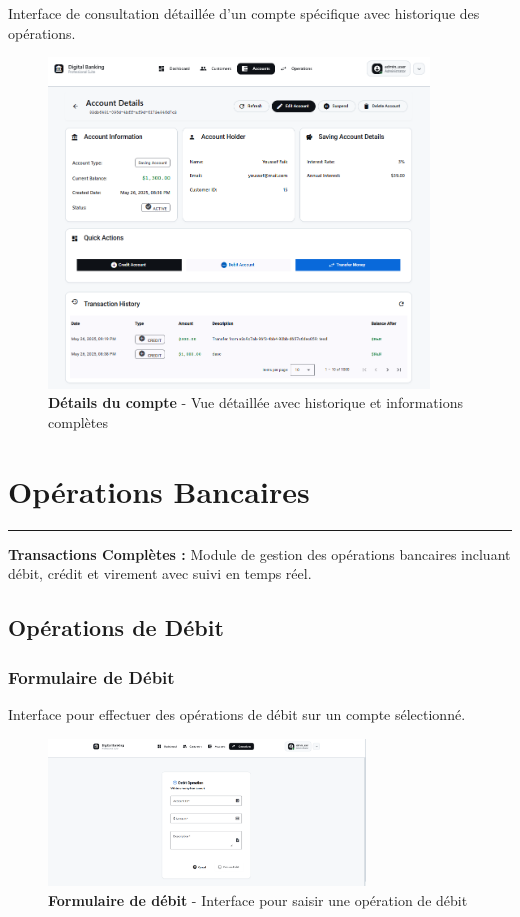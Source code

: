 \documentclass[11pt, a4paper]{article}
\newcommand{\accentline}{\textcolor{accent}{\rule{\textwidth}{1pt}}}
\begin{document}
Interface de consultation détaillée d'un compte spécifique avec historique des opérations.

\begin{figure}[H]
    \centering
    \includegraphics[width=0.9\textwidth]{screenshots/05_05_account_details_view.png}
    \caption{\textbf{Détails du compte} - Vue détaillée avec historique et informations complètes}
    \label{fig:account_details_view}
\end{figure}

\section{Opérations Bancaires}
\accentline

\textbf{Transactions Complètes :} Module de gestion des opérations bancaires incluant débit, crédit et virement avec suivi en temps réel.

\subsection{Opérations de Débit}

\subsubsection{Formulaire de Débit}

Interface pour effectuer des opérations de débit sur un compte sélectionné.

\begin{figure}[H]
    \centering
    \includegraphics[width=0.75\textwidth]{screenshots/06_01_operation_debit_form_empty.png}
    \caption{\textbf{Formulaire de débit} - Interface pour saisir une opération de débit}
    \label{fig:operation_debit_form_empty}
\end{figure}
\end{document}
